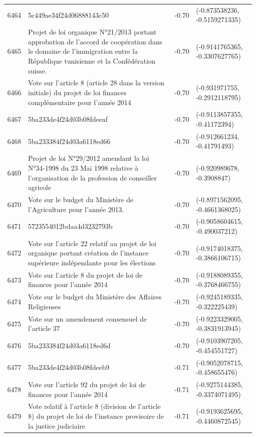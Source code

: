 \begin{table}[ht]
\begin{tabular}{rlrl}
  6464 & 5c449ae34f24d06888143c50 & -0.70 & (-0.873538236, -0.5159271335) \\ 
  6465 & Projet de loi organique N°21/2013 portant approbation de l'accord de coopération dans le domaine de l'immigration entre la République tunisienne et la Confédération suisse. & -0.70 & (-0.9141765365, -0.3307627765) \\ 
  6466 & Vote sur l'article 8 (article 28 dans la version initiale) du projet de loi finances complémentaire pour l'année 2014 & -0.70 & (-0.931971755, -0.2912118795) \\ 
  6467 & 5ba233de4f24d03b08fdeeaf & -0.70 & (-0.9113857355, -0.41172394) \\ 
  6468 & 5ba233384f24d03a6118ed66 & -0.70 & (-0.912661234, -0.41791493) \\ 
  6469 & Projet de loi N°29/2012 amendant la loi N°34-1998 du 23 Mai 1998 relative à l'organisation de la profession de conseiller agricole & -0.70 & (-0.920989678, -0.3908847) \\ 
  6470 & Vote sur le budget du Ministère de l'Agriculture pour l'année 2013. & -0.70 & (-0.8971562095, -0.4661368025) \\ 
  6471 & 5723554012bdaa4d3232793b & -0.70 & (-0.9058604615, -0.490037212) \\ 
  6472 & Vote sur l'article 22 relatif au projet de loi organique portant création de l'instance supérieure indépendante pour les élections & -0.70 & (-0.9174018375, -0.3866106715) \\ 
  6473 & Vote sur l'article 8 du projet de loi de finances pour l'année 2014 & -0.70 & (-0.9188089355, -0.3768466755) \\ 
  6474 & Vote sur le budget du Ministère des Affaires Religieuses & -0.70 & (-0.9245189335, -0.322225439) \\ 
  6475 & Vote sur un amendement consensuel de l'article 37 & -0.70 & (-0.9223329005, -0.3831913945) \\ 
  6476 & 5ba233384f24d03a6118ed6d & -0.70 & (-0.9103907205, -0.454551727) \\ 
  6477 & 5ba233de4f24d03b08fdeeb9 & -0.71 & (-0.9052078715, -0.458655476) \\ 
  6478 & Vote sur l'article 92 du projet de loi de finances pour l'année 2014 & -0.71 & (-0.9275144385, -0.3374071495) \\ 
  6479 & Vote relatif à l'article 8 (division de l'article 8) du projet de loi de l'instance provisoire de la justice judiciaire & -0.71 & (-0.9193625695, -0.4460872545) \\ 

\end{tabular}
\end{table}
